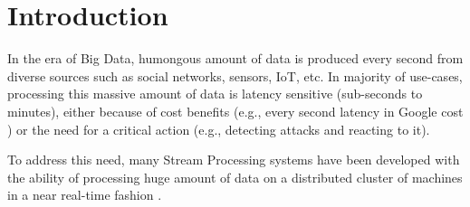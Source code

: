 \section{Introduction}
\label{sec:intro}

In the era of Big Data, humongous amount of data is produced every second from diverse sources such as social networks, sensors, IoT, etc. In majority of use-cases, processing this massive amount of data  is latency sensitive (sub-seconds to minutes), either because of  cost benefits (e.g., every second latency in Google cost ) or the need for a critical action (e.g., detecting attacks and reacting to it).

To address this need, many Stream Processing systems have been developed with the ability of processing huge amount of data on a distributed cluster of machines in a near real-time fashion .  








